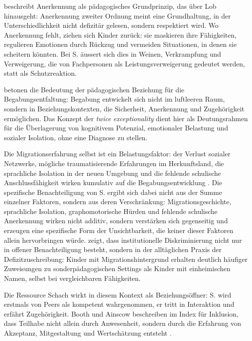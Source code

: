 \documentclass[ngerman, a4paper]{article}
\begin{document}
\textcite{grossrieder2010anerkennung} beschreibt Anerkennung als pädagogisches Grundprinzip, das über Lob
hinausgeht: Anerkennung zweiter Ordnung meint eine Grundhaltung, in der Unterschiedlichkeit
nicht defizitär gelesen, sondern respektiert wird.
Wo Anerkennung fehlt, ziehen sich Kinder zurück: sie maskieren ihre Fähigkeiten,
regulieren Emotionen durch Rückzug und vermeiden Situationen, in denen sie scheitern
könnten. Bei S. äussert sich dies in Weinen, Verkrampfung und Verweigerung, die von
Fachpersonen als Leistungsverweigerung gedeutet werden, statt als Schutzreaktion.
 
\textcite{kuhl2019diversitaet} betonen die Bedeutung der pädagogischen Beziehung für die
Begabungsentfaltung: Begabung entwickelt sich nicht im luftleeren Raum, sondern in
Beziehungskontexten, die Sicherheit, Anerkennung und Zugehörigkeit ermöglichen. Das Konzept der \textit{twice exceptionality} dient
hier als Deutungsrahmen für die Überlagerung von kognitivem Potenzial, emotionaler
Belastung und sozialer Isolation, ohne eine Diagnose zu stellen.
 
Die Migrationserfahrung selbst ist ein Belastungsfaktor: der Verlust sozialer Netzwerke,
mögliche traumatisierende Erfahrungen im Herkunftsland, die sprachliche Isolation in der
neuen Umgebung und die fehlende schulische Anschlussfähigkeit wirken kumulativ auf die
Begabungsentwicklung \parencite{behrensen2019inklusive,stamm2012migranten}.
Die spezifische Benachteiligung von S. ergibt sich dabei nicht aus der Summe
einzelner Faktoren, sondern aus deren Verschränkung: Migrationsgeschichte,
sprachliche Isolation, graphomotorische Hürden und fehlende schulische
Anerkennung wirken nicht additiv, sondern verstärken sich gegenseitig
und erzeugen eine spezifische Form der Unsichtbarkeit, die keiner dieser
Faktoren allein hervorbringen würde.
\textcite{kappus2010migration} zeigt, dass institutionelle Diskriminierung nicht nur in offener Benachteiligung
besteht, sondern in der alltäglichen Praxis der Defizitzuschreibung: Kinder mit
Migrationshintergrund erhalten deutlich häufiger Zuweisungen zu sonderpädagogischen
Settings als Kinder mit einheimischen Namen, selbst bei vergleichbaren Fähigkeiten.
 
Die Ressource Schach wirkt in diesem Kontext als Beziehungsöffner: S. wird erstmals
von Peers als kompetent wahrgenommen, er tritt in Interaktion und erfährt Zugehörigkeit.
Booth und Ainscow beschreiben im Index für Inklusion, dass Teilhabe nicht allein durch
Anwesenheit, sondern durch die Erfahrung von Akzeptanz, Mitgestaltung und
Wertschätzung entsteht \parencite{booth2019index}.
\end{document}
